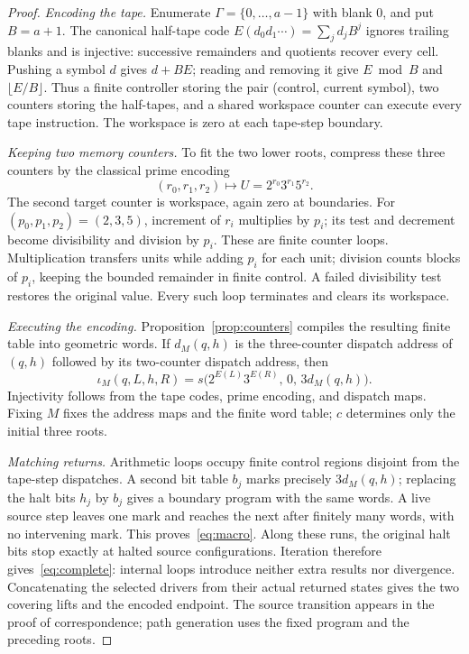 \documentclass[11pt]{article}
\theoremstyle{definition}
\theoremstyle{plain}
\begin{document}
\begin{proof}
\emph{Encoding the tape.}
Enumerate $\Gamma=\{0,\ldots,a-1\}$ with blank $0$, and put $B=a+1$.
The canonical half-tape code
$E(d_0d_1\cdots)=\sum_jd_jB^j$ ignores trailing blanks and is
injective: successive remainders and quotients recover every cell.
Pushing a symbol $d$ gives $d+BE$; reading and removing it give
$E\bmod B$ and $\lfloor E/B\rfloor$.
Thus a finite controller storing the pair (control, current symbol),
two counters storing the half-tapes, and a shared workspace counter
can execute every tape instruction. The workspace is zero at each
tape-step boundary.

\emph{Keeping two memory counters.}
To fit the two lower roots, compress these three counters by the
classical prime encoding \cite{minsky}
\[
 (r_0,r_1,r_2)\longmapsto U=2^{r_0}3^{r_1}5^{r_2}.
\]
The second target counter is workspace, again zero at boundaries.
For $(p_0,p_1,p_2)=(2,3,5)$, increment of $r_i$ multiplies by $p_i$;
its test and decrement become divisibility and division by $p_i$.
These are finite counter loops. Multiplication transfers units while
adding $p_i$ for each unit; division counts blocks of $p_i$, keeping
the bounded remainder in finite control. A failed divisibility test
restores the original value. Every such loop terminates and clears
its workspace.

\emph{Executing the encoding.}
Proposition~\ref{prop:counters} compiles the resulting finite table
into geometric words. If $d_M(q,h)$ is the three-counter dispatch
address of $(q,h)$ followed by its two-counter dispatch address, then
\[
 \iota_M(q,L,h,R)=s\bigl(2^{E(L)}3^{E(R)},\,0,\,3d_M(q,h)\bigr).
\]
Injectivity follows from the tape codes, prime encoding, and dispatch
maps. Fixing $M$ fixes the address maps and the finite word table;
$c$ determines only the initial three roots.

\emph{Matching returns.}
Arithmetic loops occupy finite control regions disjoint from the
tape-step dispatches. A second bit table $b_j$ marks precisely
$3d_M(q,h)$; replacing the halt bits $h_j$ by $b_j$ gives a boundary
program with the same words.
A live source step leaves one mark and reaches the next after finitely
many words, with no intervening mark. This proves~\eqref{eq:macro}.
Along these runs, the original halt bits stop exactly at halted
source configurations. Iteration therefore gives~\eqref{eq:complete}:
internal loops introduce neither extra results nor divergence.
Concatenating the selected drivers from their actual returned states
gives the two covering lifts and the encoded endpoint.
The source transition appears in the proof of correspondence; path
generation uses the fixed program and the preceding roots.
\end{proof}
\end{document}

